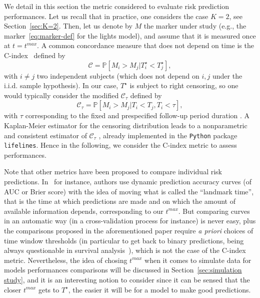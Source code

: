 \documentclass[11pt]{article}
\newcommand{\cC}{\mathcal C}
\renewcommand{\P}{\mathds P}
\begin{document}
We detail in this section the metric considered to evaluate risk prediction performances. Let us recall that in practice, one considers the case $K=2$, see Section~\ref{sec:K=2}. Then, let us denote by $M$ the marker under study (e.g., the marker~\eqref{eq:marker-def} for the lights model), and assume that it is measured once at $t = t^{max}$.
A common concordance measure that does not depend on time is the C-index~\citep{harrell1996tutorial} defined by
\begin{equation*}
  \cC =\P[M_i > M_j | T^\star_i < T^\star_j],
\end{equation*}
with $i \neq j$ two independent subjects (which does not depend on $i, j$ under the i.i.d. sample hypothesis). 
In our case,  $T^\star$ is subject to right censoring, so one would typically consider the modified $\cC_\tau$ defined by
\begin{equation*}
  \cC_\tau =\P[M_i > M_j | T_i < T_j , T_i < \tau],
\end{equation*}
with $\tau$ corresponding to the fixed and prespecified follow-up period duration \citep{heagerty2005survival}. A Kaplan-Meier estimator for the censoring distribution leads to a nonparametric and consistent estimator of $\cC_\tau$ \citep{uno2011c}, already implemented in the \texttt{Python} package \texttt{lifelines}.
Hence in the following, we consider the C-index metric to assess performances.

Note that other metrics have been proposed to compare individual risk predictions. In~\citet{blanche2015quantifying} for instance, authors use dynamic prediction accuracy curves (of AUC or Brier score) with the idea of moving what is called the ``landmark time'', that is the time at which predictions are made and on which the amount of available information depends, corresponding to our $t^{max}$. But comparing curves in an automatic way (in a cross-validation process for instance) is never easy, plus the comparisons proposed in the aforementioned paper require \textit{a priori} choices of time window thresholds (in particular to get back to binary predictions, being always questionable in survival analysis~\citep{bussy2019comparison}), which is not the case of the C-index metric.
Nevertheless, the idea of chosing $t^{max}$ when it comes to simulate data for models performances comparisons will be discussed in Section~\ref{sec:simulation study}, and it is an interesting notion to consider since it can be sensed that the closer $t^{max}$ gets to $T^\star$, the easier it will be for a model to make good predictions.
\end{document}
